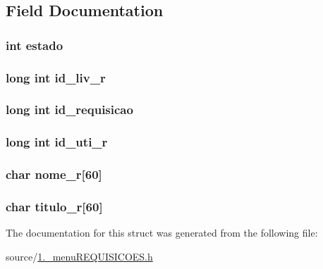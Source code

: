\subsection{Field Documentation}
\hypertarget{structrequisicao_a876d08c1d21086e4fd228744da10d028}{
\subsubsection[{estado}]{\setlength{\rightskip}{0pt plus 5cm}int estado}}\label{structrequisicao_a876d08c1d21086e4fd228744da10d028}
\hypertarget{structrequisicao_af636ce6e374d3e55eeb00565c29faf01}{
\subsubsection[{id\+\_\+liv\+\_\+r}]{\setlength{\rightskip}{0pt plus 5cm}long int id\+\_\+liv\+\_\+r}}\label{structrequisicao_af636ce6e374d3e55eeb00565c29faf01}
\hypertarget{structrequisicao_a83bcbbb52167d11b977097b6e3c282c9}{
\subsubsection[{id\+\_\+requisicao}]{\setlength{\rightskip}{0pt plus 5cm}long int id\+\_\+requisicao}}\label{structrequisicao_a83bcbbb52167d11b977097b6e3c282c9}
\hypertarget{structrequisicao_a46ba42e509577cf7ad9429d2293ff577}{
\subsubsection[{id\+\_\+uti\+\_\+r}]{\setlength{\rightskip}{0pt plus 5cm}long int id\+\_\+uti\+\_\+r}}\label{structrequisicao_a46ba42e509577cf7ad9429d2293ff577}
\hypertarget{structrequisicao_a1c7ba6d3e1e3e317652826e28fd517aa}{
\subsubsection[{nome\+\_\+r}]{\setlength{\rightskip}{0pt plus 5cm}char nome\+\_\+r\mbox{[}60\mbox{]}}}\label{structrequisicao_a1c7ba6d3e1e3e317652826e28fd517aa}
\hypertarget{structrequisicao_aa943485cb21e39e8c25250f36453db59}{
\subsubsection[{titulo\+\_\+r}]{\setlength{\rightskip}{0pt plus 5cm}char titulo\+\_\+r\mbox{[}60\mbox{]}}}\label{structrequisicao_aa943485cb21e39e8c25250f36453db59}


The documentation for this struct was generated from the following file\+:\begin{DoxyCompactItemize}
\item 
source/\hyperlink{1_83__menu_r_e_q_u_i_s_i_c_o_e_s_8h}{1.\+\_\+menu\+R\+E\+Q\+U\+I\+S\+I\+C\+O\+E\+S.\+h}\end{DoxyCompactItemize}
